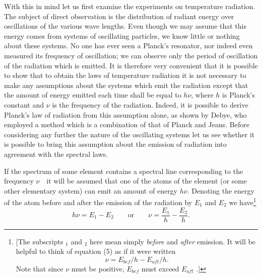 With this in mind let us first examine the experiments on temperature
radiation. The subject of direct observation is the distribution of
radiant energy over oscillations of the various wave lengths. Even
though we may assume that this energy comes from systems of oscillating
particles, we know little or nothing about these systems. No one has
ever seen a Planck's resonator, nor indeed even measured its frequency
of oscillation; we can observe only the period of oscillation of the
radiation which is emitted. It is therefore very convenient that it is
possible to show that to obtain the laws of temperature radiation it is
not necessary to make any assumptions about the systems which emit the
radiation except that the amount of energy emitted each time shall be
equal to $h\nu$, where $h$ is Planck's constant and $\nu$ is
the frequency of the radiation. Indeed, it is possible to derive
Planck's law of radiation from this assumption alone, as shown by Debye,
who employed a method which is a combination of that of Planck and
Jeans. Before considering any further the nature of the oscillating
systems let us see whether it is possible to bring this assumption about
the emission of radiation into agreement with the spectral laws.

If the spectrum of some element contains a spectral line corresponding
to the frequency $\nu$~~it will be assumed that one of the atoms of
the element (or some other elementary system) can emit an amount of
energy $h\nu$. Denoting the energy of the atom before and after the
emission of the radiation by $E_1$ and $E_2$ we have\footnote{{[}The
  subscripts $_1$ and $_2$ here mean simply \emph{before} and \emph{after}
  emission. It will be helpful to think of equation (5) as if it were
  written
  \begin{equation*}
  \nu = E_{bef}/h - E_{aft}/h.
  \end{equation*} 
Note that since $\nu$ must be positive, $E_{bef}$ must exceed $E_{aft}$ .{]}}
%
\begin{equation}
h\nu = E_1 - E_2 \qquad \text{or} \qquad \nu = \frac{E_1}{h} - \frac{E_2}{h} .
\end{equation}
%

